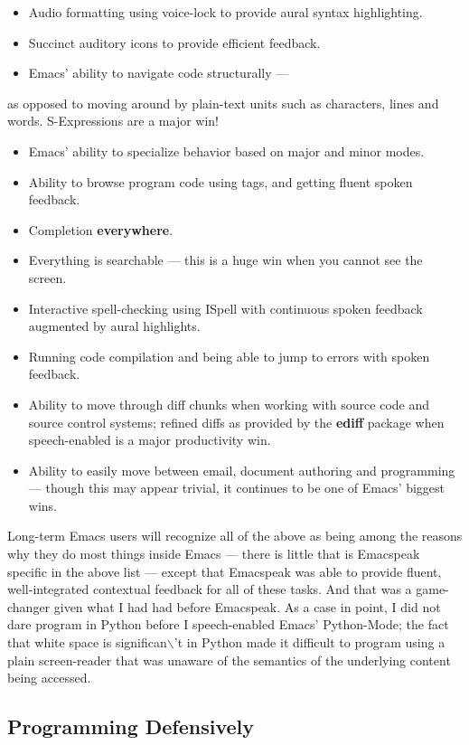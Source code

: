 \documentclass[11pt]{article}
\begin{document}
\begin{itemize}
\item Audio formatting using voice-lock to provide aural syntax
highlighting.
\item Succinct auditory icons to provide efficient feedback.
\item Emacs' ability to navigate code structurally   —
\end{itemize}
as opposed to moving around by plain-text units such as
  characters, lines and words. S-Expressions are a major win!
\begin{itemize}
\item Emacs' ability to specialize behavior based on major and
minor modes.
\item Ability to browse program code using  tags, and getting
fluent spoken feedback.
\item Completion \textbf{everywhere}.
\item Everything is searchable   —   this is a huge win when you
cannot see the screen.
\item Interactive spell-checking using ISpell with continuous
spoken feedback augmented by aural highlights.
\item Running code compilation  and being able to jump to errors
with spoken feedback.
\item Ability to move through diff chunks when working with source
code and source control systems; refined diffs as provided by
the \textbf{ediff} package when speech-enabled is a major
productivity win.
\item Ability to easily move between email, document authoring and
programming — though this may appear trivial, it continues to
be one of Emacs' biggest wins.
\end{itemize}


Long-term Emacs users will recognize all of the above as being
among the reasons why they do most things inside Emacs — there is
little that is Emacspeak specific in the above list — except that
Emacspeak was able to provide fluent, well-integrated contextual
feedback for all of these tasks. And that was a game-changer
given what I had had before Emacspeak. As a case in point, I did
not dare program in Python before I speech-enabled Emacs'
Python-Mode; the fact that white space is significan$\backslash$'t in Python
made it difficult to program using a plain screen-reader that was
unaware of the semantics of the underlying content being
accessed.

\subsection{Programming Defensively}
\label{sec:org38cc750}
\end{document}
